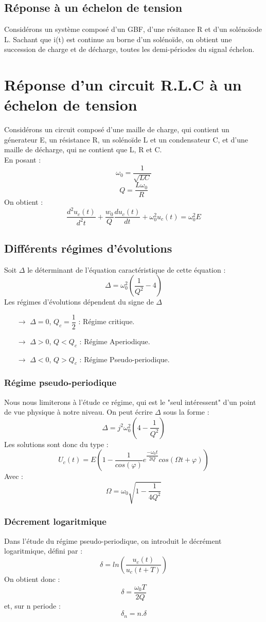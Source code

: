 \subsection{Réponse à un échelon de tension}
Considérons un système composé d'un GBF, d'une résitance R et d'un solénoïode L.
Sachant que i(t) est continue au borne d'un solénoïde, on obtient une succession de charge et de décharge, toutes les demi-périodes du signal échelon.
\section{Réponse d'un circuit R.L.C à un échelon de tension}
Considérons un circuit composé d'une maille de charge, qui contient un génerateur E, un résistance R, un solénoïde L et un condensateur C, et d'une maille de décharge, qui ne contient que L, R et C.\\
En posant : 
$$\omega_0 = \dfrac{1}{\sqrt{LC}}$$
$$Q = \dfrac{L\omega_0}{R}$$
On obtient :
$$\dfrac{d^2u_c(t)}{d^2t} + \dfrac{w_0}{Q}\dfrac{du_c(t)}{dt} + \omega_0^2u_c(t) = \omega_0^2E$$
\subsection{Différents régimes d'évolutions}
Soit $\Delta$ le déterminant de l'équation caractéristique de cette équation :
$$\Delta = \omega_0^2\left( \dfrac{1}{Q^2} - 4\right)$$
Les régimes d'évolutions dépendent du signe de $\Delta$
\begin{itemize}
 \item[$\rightarrow$] $\Delta = 0$, $Q_c = \dfrac{1}{2}$ : Régime critique. \\
 \item[$\rightarrow$] $\Delta > 0$, $Q < Q_c$ : Régime Aperiodique. \\
 \item[$\rightarrow$] $\Delta < 0$, $Q > Q_c$ : Régime Pseudo-periodique. \\
\end{itemize}
\subsubsection{Régime pseudo-periodique}
Nous nous limiterons à l'étude ce régime, qui est le "seul intéressent" d'un point de vue physique à notre niveau.
On peut écrire $\Delta$ sous la forme :
$$\Delta = j^2\omega_0^2(4-\dfrac{1}{Q^2})$$
Les solutions sont donc du type :
$$U_c(t) = E\left( 1 - \dfrac{1}{cos(\varphi)}e^{\dfrac{-\omega_0t}{2Q}}cos(\Omega t+\varphi)\right)$$
Avec :
$$\Omega = \omega_0\sqrt{1 - \dfrac{1}{4Q^2}}$$
\subsubsection{Décrement logaritmique}
Dans l'étude du régime pseudo-periodique, on introduit le décrément logaritmique, défini par :
$$\delta = ln\left(\dfrac{u_c(t)}{u_c(t+T)}\right) $$
On obtient donc :
$$\delta = \dfrac{\omega_0T}{2Q}$$
et, sur n periode :
$$\delta_n = n.\delta$$
